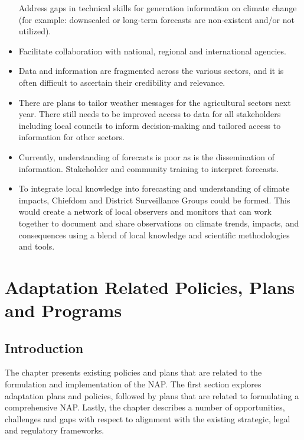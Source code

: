\documentclass[
]{book}
\begin{document}
\begin{itemize}
  Address gaps in technical skills for generation information on climate change (for example: downscaled or long-term forecasts are non-existent and/or not utilized).
\item
  Facilitate collaboration with national, regional and international agencies.
\item
  Data and information are fragmented across the various sectors, and it is often difficult to ascertain their credibility and relevance.
\item
  There are plans to tailor weather messages for the agricultural sectors next year. There still needs to be improved access to data for all stakeholders including local councils to inform decision-making and tailored access to information for other sectors.
\item
  Currently, understanding of forecasts is poor as is the dissemination of information. Stakeholder and community training to interpret forecasts.
\item
  To integrate local knowledge into forecasting and understanding of climate impacts, Chiefdom and District Surveillance Groups could be formed. This would create a network of local observers and monitors that can work together to document and share observations on climate trends, impacts, and consequences using a blend of local knowledge and scientific methodologies and tools.
\end{itemize}

\hypertarget{adaptation-related-policies-plans-and-programs}{%
\chapter{Adaptation Related Policies, Plans and Programs}\label{adaptation-related-policies-plans-and-programs}}

\hypertarget{introduction-3}{%
\section{Introduction}\label{introduction-3}}

The chapter presents existing policies and plans that are related to the formulation and implementation of the NAP. The first section explores adaptation plans and policies, followed by plans that are related to formulating a comprehensive NAP. Lastly, the chapter describes a number of opportunities, challenges and gaps with respect to alignment with the existing strategic, legal and regulatory frameworks.
\end{document}
